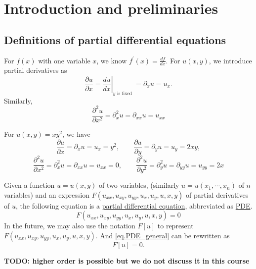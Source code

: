 \section{Introduction and preliminaries}

\subsection{Definitions of partial differential equations}

\begin{definition}
For $f(x)$ with one variable $x$, we know $f^{\prime}(x)=\frac{d f}{d x}$. For $u(x, y)$, we introduce partial derivatives as
\begin{equation}\label{eq.1st_derivatives}
    \frac{\partial u}{\partial x}=\left.\frac{d u}{d x}\right|_{y \text { is fixed }}=\partial_x u=u_x .
\end{equation}
Similarly,
\begin{equation}\label{eq.2nd_derivatives}
    \frac{\partial^2 u}{\partial x^2}=\partial_x^2 u=\partial_{xx} u=u_{x x}
\end{equation}
\end{definition}

\begin{example}[]
For $u(x, y)=x y^2$, we have
\begin{equation*}
\frac{\partial u}{\partial x} = \partial_x u = u_x = y^2, \qquad \frac{\partial u}{\partial y} = \partial_y u = u_y = 2 x y,
\end{equation*}
\begin{equation*}
\frac{\partial^2 u}{\partial x^2}=\partial_x^2 u=\partial_{xx} u=u_{x x}=0, \qquad \frac{\partial^2 u}{\partial y^2}=\partial_y^2 u=\partial_{yy} u=u_{y y}=2 x
\end{equation*}

\end{example}

\begin{definition}
    Given a function $u = u(x, y)$ of two variables, (similarly $u = u(x_1, \cdots, x_n)$ of $n$ variables) and an expression $F(u_{xx}, u_{xy}, u_{yy}, u_{x}, u_{y}, u, x, y)$ of partial derivatives of $u$, the following equation is a \underline{partial differential equation}, abbreviated as \underline{PDE}.
    \begin{equation}\label{eq.PDE_general}
        F(u_{xx}, u_{xy}, u_{yy}, u_{x}, u_{y}, u, x, y) = 0
    \end{equation}
    In the future, we may also use the notation $F[u]$ to represent $F(u_{xx}, u_{xy}, u_{yy}, u_{x}, u_{y}, u, x, y)$. And \eqref{eq.PDE_general} can be rewritten as 
    \begin{equation}\label{eq.PDE_general_short}
        F[u] = 0.
    \end{equation}
\end{definition}
\begin{remark}[]
    \textbf{TODO: higher order is possible but we do not discuss it in this course}
\end{remark}

